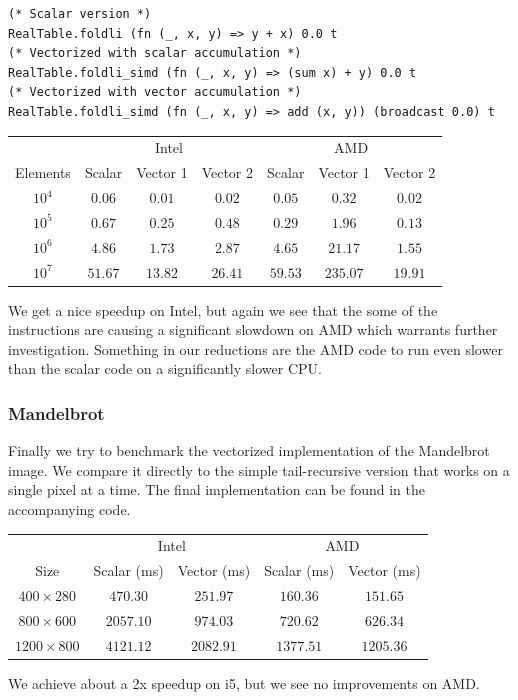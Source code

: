 \documentclass{article}
\begin{document}
\begin{verbatim}
(* Scalar version *)
RealTable.foldli (fn (_, x, y) => y + x) 0.0 t
(* Vectorized with scalar accumulation *)
RealTable.foldli_simd (fn (_, x, y) => (sum x) + y) 0.0 t
(* Vectorized with vector accumulation *)
RealTable.foldli_simd (fn (_, x, y) => add (x, y)) (broadcast 0.0) t
\end{verbatim}
\begin{center}
\begin{tabular}{c c c c c c c}
    \toprule
    & \multicolumn{3}{c}{Intel} & \multicolumn{3}{c}{AMD} \\
    Elements & Scalar & Vector 1 & Vector 2 & Scalar & Vector 1 & Vector 2 \\
    \midrule
    $10^4$ & $0.06$ & $0.01$ & $0.02$ & $0.05$ & $0.32$ & $0.02$ \\
    $10^5$ & $0.67$ & $0.25$ & $0.48$ & $0.29$ & $1.96$ & $0.13$ \\
    $10^6$ & $4.86$ & $1.73$ & $2.87$ & $4.65$ & $21.17$ & $1.55$ \\
    $10^7$ & $51.67$ & $13.82$ & $26.41$ & $59.53$ & $235.07$ & $19.91$ \\
    \bottomrule
\end{tabular}
\end{center}
We get a nice speedup on Intel, but again we see that the some of the instructions are causing a significant slowdown on AMD which warrants further investigation. Something in our reductions are the AMD code to run even slower than the scalar code on a significantly slower CPU.

\subsubsection{Mandelbrot}

Finally we try to benchmark the vectorized implementation of the Mandelbrot image. We compare it directly to the simple tail-recursive version that works on a single pixel at a time. The final implementation can be found in the accompanying code.

\begin{center}
\begin{tabular}{c c c c c}
    \toprule
    & \multicolumn{2}{c}{Intel} & \multicolumn{2}{c}{AMD} \\
    Size & Scalar (ms) & Vector (ms) & Scalar (ms) & Vector (ms) \\
    \midrule
    $400 \times 280$ & $470.30$ & $251.97$ & $160.36$ & $151.65$ \\
    $800 \times 600$ & $2057.10$ & $974.03$ & $720.62$ & $626.34$ \\
    $1200 \times 800$ & $4121.12$ & $2082.91$ & $1377.51$ & $1205.36$ \\
    \bottomrule
\end{tabular}
\end{center}
We achieve about a 2x speedup on i5, but we see no improvements on AMD.
\end{document}
